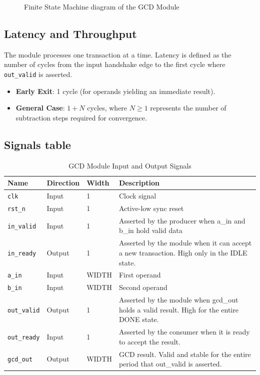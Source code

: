 
\begin{figure}[H]
    \centering
    
    \caption{Finite State Machine diagram of the GCD Module}
    \label{fig:fsm_diagram}
\end{figure}


\subsection{Latency and Throughput}
The module processes one transaction at a time. Latency is defined as the number of cycles from the input handshake edge to the first cycle where \texttt{out\_valid} is asserted.
\begin{itemize}
    \item \textbf{Early Exit}: 1 cycle (for operands yielding an immediate result).
    \item \textbf{General Case}: $1 + N$ cycles, where $N \ge 1$ represents the number of subtraction steps required for convergence.
\end{itemize}

\subsection{Signals table}
\begin{table}[H]
    \centering
    \renewcommand{\arraystretch}{1.3}
    \begin{tabular}{|l|l|l|p{8cm}|}
        \hline
        \textbf{Name} & \textbf{Direction} & \textbf{Width} & \textbf{Description} \\ \hline
        \texttt{clk} & Input & 1 & Clock signal \\ \hline
        \texttt{rst\_n} & Input & 1 & Active-low sync reset \\ \hline
        \texttt{in\_valid} & Input & 1 & Asserted by the producer when a\_in and b\_in hold valid data \\ \hline
        \texttt{in\_ready} & Output & 1 & Asserted by the module when it can accept a new transaction. High only in the IDLE state. \\ \hline
        \texttt{a\_in} & Input & WIDTH & First operand \\ \hline
        \texttt{b\_in} & Input & WIDTH & Second operand \\ \hline
        \texttt{out\_valid} & Output & 1 & Asserted by the module when gcd\_out holds a valid result. High for the entire DONE state. \\ \hline
        \texttt{out\_ready} & Input & 1 & Asserted by the consumer when it is ready to accept the result. \\ \hline
        \texttt{gcd\_out} & Output & WIDTH & GCD result. Valid and stable for the entire period that out\_valid is asserted. \\ \hline
    \end{tabular}
    \caption{GCD Module Input and Output Signals}
    \label{tab:gcd_signals}
\end{table}

